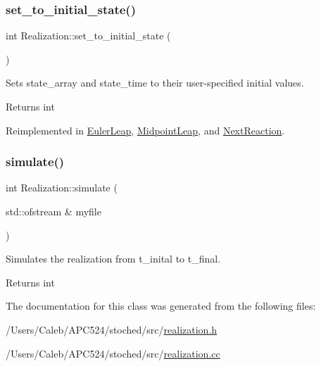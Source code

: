 \subsubsection{\texorpdfstring{set\+\_\+to\+\_\+initial\+\_\+state()}{set\_to\_initial\_state()}}
{\footnotesize\ttfamily int Realization\+::set\+\_\+to\+\_\+initial\+\_\+state (\begin{DoxyParamCaption}{ }\end{DoxyParamCaption})\hspace{0.3cm}{\ttfamily [virtual]}}



Sets state\+\_\+array and state\+\_\+time to their user-\/specified initial values. 

\begin{DoxyReturn}{Returns}
int 
\end{DoxyReturn}


Reimplemented in \hyperlink{class_euler_leap_a1a13929ea1ebf40e7357439968828f4b}{Euler\+Leap}, \hyperlink{class_midpoint_leap_a177682cf5042407ccee1a443e8920896}{Midpoint\+Leap}, and \hyperlink{class_next_reaction_a0cc63c4ec9fe3f338472fff302f6d746}{Next\+Reaction}.

\mbox{\label{class_realization_a4e21bc7355e33c17d1401736b3c62413}} 
\subsubsection{\texorpdfstring{simulate()}{simulate()}}
{\footnotesize\ttfamily int Realization\+::simulate (\begin{DoxyParamCaption}\item[{std\+::ofstream \&}]{myfile }\end{DoxyParamCaption})}



Simulates the realization from t\+\_\+inital to t\+\_\+final. 

\begin{DoxyReturn}{Returns}
int 
\end{DoxyReturn}


The documentation for this class was generated from the following files\+:\begin{DoxyCompactItemize}
\item 
/\+Users/\+Caleb/\+A\+P\+C524/stoched/src/\hyperlink{realization_8h}{realization.\+h}\item 
/\+Users/\+Caleb/\+A\+P\+C524/stoched/src/\hyperlink{realization_8cc}{realization.\+cc}\end{DoxyCompactItemize}
